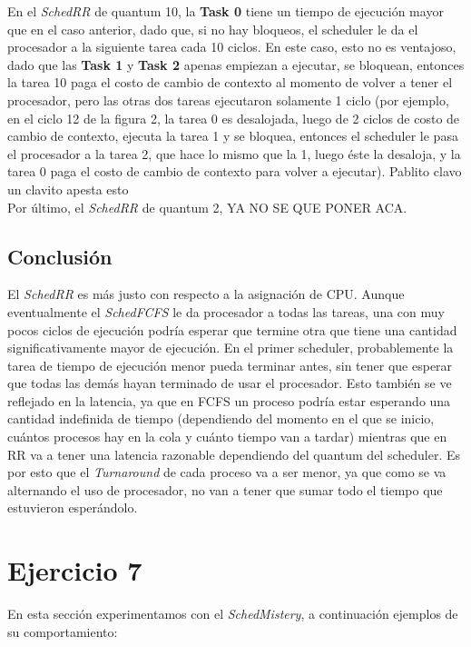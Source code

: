 \documentclass[11pt]{article}
\begin{document}
En el \textit{SchedRR} de quantum 10, la \textbf{Task 0} tiene un tiempo de ejecución mayor que en el caso anterior, dado que, si no hay bloqueos, el scheduler le da el procesador a la siguiente tarea cada 10 ciclos. En este caso, esto no es ventajoso, dado que las \textbf{Task 1} y \textbf{Task 2} apenas empiezan a ejecutar, se bloquean, entonces la tarea 10 paga el costo de cambio de contexto al momento de volver a tener el procesador, pero las otras dos tareas ejecutaron solamente 1 ciclo (por ejemplo, en el ciclo 12 de la figura 2, la tarea 0 es desalojada, luego de 2 ciclos de costo de cambio de contexto, ejecuta la tarea 1 y se bloquea, entonces el scheduler le pasa el procesador a la tarea 2, que hace lo mismo que la 1, luego éste la desaloja, y la tarea 0 paga el costo de cambio de contexto para volver a ejecutar). Pablito clavo un clavito apesta esto \\

Por último, el \textit{SchedRR} de quantum 2, YA NO SE QUE PONER ACA. 
 
\subsection{Conclusión}

El \textit{SchedRR} es más justo con respecto a la asignación de CPU. Aunque eventualmente el \textit{SchedFCFS} le da procesador a todas las tareas, una con muy pocos ciclos de ejecución podría esperar que termine otra que tiene una cantidad significativamente mayor de ejecución. En el primer scheduler, probablemente la tarea de tiempo de ejecución menor pueda terminar antes, sin tener que esperar que todas las demás hayan terminado de usar el procesador. Esto también se ve reflejado en la latencia, ya que en FCFS un proceso podría estar esperando una cantidad indefinida de tiempo (dependiendo del momento en el que se inicio, cuántos procesos hay en la cola y cuánto tiempo van a tardar) mientras que en RR va a tener una latencia razonable dependiendo del quantum del scheduler. Es por esto que el \textit{Turnaround} de cada proceso va a ser menor, ya que como se va alternando el uso de procesador, no van a tener que sumar todo el tiempo que estuvieron esperándolo.

\section{Ejercicio 7}

En esta sección experimentamos con el \textit{SchedMistery}, a continuación ejemplos de su comportamiento:
\end{document}
